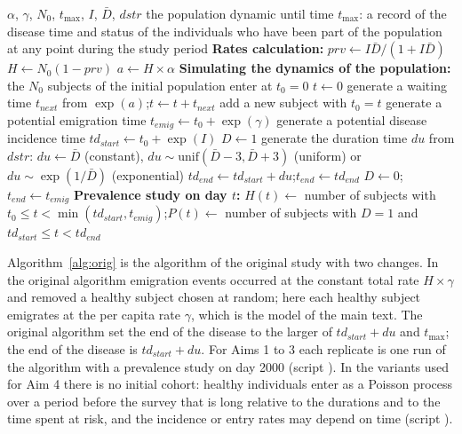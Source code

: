 \begin{algorithm}[!ht]
\caption{Simulation of the individual histories of one dynamic population (Aims 1 to 3).}
\label{alg:orig}
\begin{algorithmic}[1]
\Require $\alpha$, $\gamma$, $N_0$, $t_{\max}$, $I$, $\bar D$, $dstr$
\Statex {}
\Ensure the population dynamic until time $t_{\max}$: a record of the disease time and status of the individuals who have been part of the population at any point during the study period
\State \textbf{Rates calculation:}
\State $prv\gets I\bar D/(1+I\bar D)$ 
\State $H\gets N_0(1-prv)$ 
\State $a\gets H\times\alpha$ 
\State \textbf{Simulating the dynamics of the population:}
\State the $N_0$ subjects of the initial population enter at $t_0=0$
\State $t\gets 0$
\Repeat
  \State generate a waiting time $t_{next}$ from $\exp(a)$;\quad $t\gets t+t_{next}$
  \State add a new subject with $t_0=t$ 
  \State generate a potential emigration time $t_{emig}\gets t_0+\exp(\gamma)$ 
  \State generate a potential disease incidence time $td_{start}\gets t_0+\exp(I)$
     \State $D\gets 1$
     \State generate the duration time $du$ from $dstr$: $du\gets\bar D$ (constant), $du\sim\mathrm{unif}(\bar D-3,\bar D+3)$ (uniform) or $du\sim\exp(1/\bar D)$ (exponential)
     \State $td_{end}\gets td_{start}+du$;\quad $t_{end}\gets td_{end}$
  \Else
     \State $D\gets 0$;\quad $t_{end}\gets t_{emig}$ 
  \EndIf
\EndFor
\State \textbf{Prevalence study on day $t$:} $H(t)\gets$ number of subjects with $t_0\le t<\min(td_{start},t_{emig})$;\quad $P(t)\gets$ number of subjects with $D=1$ and $td_{start}\le t<td_{end}$
\end{algorithmic}
\end{algorithm}

Algorithm~\ref{alg:orig} is the algorithm of the original study with two changes. In the original algorithm emigration events occurred at the constant total rate $H\times\gamma$ and removed a healthy subject chosen at random; here each healthy subject emigrates at the per capita rate $\gamma$, which is the model of the main text. The original algorithm set the end of the disease to the larger of $td_{start}+du$ and $t_{\max}$; the end of the disease is $td_{start}+du$. For Aims 1 to 3 each replicate is one run of the algorithm with a prevalence study on day 2000 (script ). In the variants used for Aim 4 there is no initial cohort: healthy individuals enter as a Poisson process over a period before the survey that is long relative to the durations and to the time spent at risk, and the incidence or entry rates may depend on time (script ).


